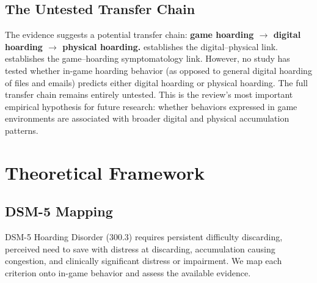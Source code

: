 \documentclass[12pt]{article}
\begin{document}
\subsection{The Untested Transfer Chain}

The evidence suggests a potential transfer chain: \textbf{game hoarding $\rightarrow$ digital hoarding $\rightarrow$ physical hoarding.} \citet{Thorpe2019} establishes the digital--physical link. \citet{Garea2023} establishes the game--hoarding symptomatology link. However, no study has tested whether in-game hoarding behavior (as opposed to general digital hoarding of files and emails) predicts either digital hoarding or physical hoarding. The full transfer chain remains entirely untested. This is the review's most important empirical hypothesis for future research: whether behaviors expressed in game environments are associated with broader digital and physical accumulation patterns.

\section{Theoretical Framework}

\subsection{DSM-5 Mapping}

DSM-5 Hoarding Disorder (300.3) requires persistent difficulty discarding, perceived need to save with distress at discarding, accumulation causing congestion, and clinically significant distress or impairment. We map each criterion onto in-game behavior and assess the available evidence.
\end{document}
